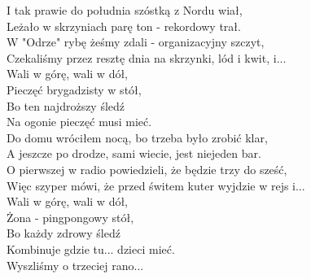 I tak prawie do południa szóstką z Nordu wiał, \\
Leżało w skrzyniach parę ton - rekordowy trał. \\
W "Odrze" rybę żeśmy zdali - organizacyjny szczyt, \\
Czekaliśmy przez resztę dnia na skrzynki, lód i kwit, i... \\

Wali w górę, wali w dół, \\
Pieczęć brygadzisty w stół, \\
Bo ten najdroższy śledź \\
Na ogonie pieczęć musi mieć. \\

Do domu wróciłem nocą, bo trzeba było zrobić klar, \\
A jeszcze po drodze, sami wiecie, jest niejeden bar. \\
O pierwszej w radio powiedzieli, że będzie trzy do sześć, \\
Więc szyper mówi, że przed świtem kuter wyjdzie w rejs i... \\

Wali w górę, wali w dół, \\
Żona - pingpongowy stół, \\
Bo każdy zdrowy śledź \\
Kombinuje gdzie tu... dzieci mieć. \\

Wyszliśmy o trzeciej rano... \\

